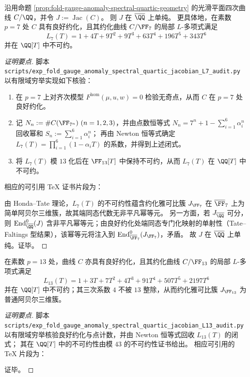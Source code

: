 \begin{proposition}\label{prop:fold-gauge-anomaly-spectral-quartic-jacobian-simple}
沿用命题 \ref{prop:fold-gauge-anomaly-spectral-quartic-geometry} 的光滑平面四次曲线 \(C/\QQ\)，并令 \(J:=\operatorname{Jac}(C)\)。
则 \(J\) 在 \(\overline{\QQ}\) 上单纯。
更具体地，在素数 \(p=7\) 处 \(C\) 具有良好约化，且其约化曲线 \(C/\FF_{7}\) 的局部 \(L\)-多项式满足
\[
\boxed{\ L_{7}(T)=1+4T+9T^{2}+9T^{3}+63T^{4}+196T^{5}+343T^{6}\ }
\]
并在 \(\QQ[T]\) 中不可约。
\end{proposition}
\begin{proof}[证明要点]
脚本 \texttt{scripts/exp\_fold\_gauge\_anomaly\_spectral\_quartic\_jacobian\_L7\_audit.py} 以有限域穷举实现如下核验：
\begin{enumerate}
  \item 在 \(p=7\) 上对齐次模型 \(F^{\mathrm{hom}}(\mu,u,w)=0\) 检验无奇点，从而 \(C\) 在 \(p=7\) 处良好约化。
  \item 记 \(N_n:=\#C(\FF_{7^{n}})\ (n=1,2,3)\)，并由点数恒等式
  \(
  N_n=7^n+1-\sum_{i=1}^{6}\alpha_i^{n}
  \)
  回收幂和 \(S_n:=\sum_{i=1}^{6}\alpha_i^{n}\)；
  再由 Newton 恒等式确定 \(L_7(T)=\prod_{i=1}^{6}(1-\alpha_iT)\) 的系数，并得到上述闭式。
  \item 将 \(L_7(T)\) 模 \(13\) 化后在 \(\FF_{13}[T]\) 中保持不可约，从而 \(L_7(T)\) 在 \(\QQ[T]\) 中不可约。
\end{enumerate}
相应的可引用 TeX 证书片段为：

\par
由 Honda--Tate 理论，\(L_7(T)\) 的不可约性蕴含约化雅可比簇 \(J_{\FF_7}\) 在 \(\overline{\FF}_7\) 上为简单阿贝尔三维簇，故其端同态代数无非平凡幂等元。
另一方面，若 \(J_{\overline{\QQ}}\) 可分，则 \(\mathrm{End}^0_{\overline{\QQ}}(J)\) 含非平凡幂等元；由良好约化处端同态专门化映射的单射性（Tate--Faltings 型结果），该幂等元将注入到 \(\mathrm{End}^0_{\overline{\FF}_{7}}(J_{\FF_7})\)，矛盾。
故 \(J\) 在 \(\overline{\QQ}\) 上单纯。证毕。
\end{proof}

\begin{proposition}\label{prop:fold-gauge-anomaly-spectral-quartic-jacobian-L13}
在素数 \(p=13\) 处，曲线 \(C\) 亦具有良好约化，且其约化曲线 \(C/\FF_{13}\) 的局部 \(L\)-多项式满足
\[
\boxed{\ L_{13}(T)=1+3T+7T^{2}+4T^{3}+91T^{4}+507T^{5}+2197T^{6}\ }
\]
并在 \(\QQ[T]\) 中不可约；其三次系数 \(4\) 不被 \(13\) 整除，从而约化雅可比簇 \(J_{\FF_{13}}\) 为普通阿贝尔三维簇。
\end{proposition}
\begin{proof}[证明要点]
脚本 \texttt{scripts/exp\_fold\_gauge\_anomaly\_spectral\_quartic\_jacobian\_L13\_audit.py} 以有限域穷举核验良好约化与点计数，并由 Newton 恒等式回收 \(L_{13}(T)\) 的闭式；
其在 \(\QQ[T]\) 中的不可约性由模 \(43\) 的不可约性证书给出。
相应可引用的 TeX 片段为：

证毕。
\end{proof}


